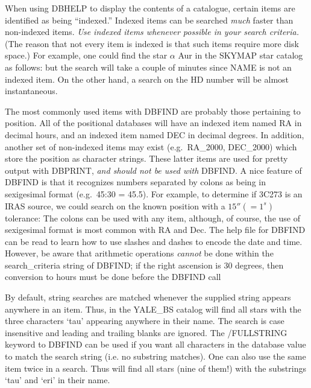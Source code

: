 When using DBHELP to display the contents of a catalogue, certain items are
identified as being ``indexed.''  Indexed items can be searched {\em much} 
faster than non-indexed items. 
{\em Use indexed items whenever possible in your search criteria.}   
(The reason that not every item is indexed is that such items require more disk
space.)
For example, one could find
the star $\alpha$ Aur in the SKYMAP star catalog as follows:
\exbegin
{}
\exend
but the search will take a couple of  minutes since NAME is not an indexed
item.  On the other hand, a search on the HD number will be almost
instantaneous.
\exbegin
{}
\exend 

The most commonly used items with DBFIND are probably those 
pertaining to position.
All of the positional databases will have an indexed item named RA in decimal
hours, and an indexed item named DEC in decimal degrees.  In addition, another
set of non-indexed items may exist (e.g.\ RA\_2000, DEC\_2000) which store
the position as character strings.  These latter items are used for pretty
output with DBPRINT, {\em and should not be used with} DBFIND.  A nice
feature of DBFIND is that it recognizes numbers separated by colons as being
in sexigesimal format (e.g.\  45:30 = 45.5).
For example, to determine if 3C273 is an IRAS source, we could search on the
known position with a $15'' (=1^s)$ tolerance:
\exbegin
{}
\exend
The colons can be used with any item, although, of course, the use of 
sexigesimal format is most common with RA and Dec.   The help file for
DBFIND can be read to learn how to use slashes and dashes to encode the
date and time.  However, be aware that arithmetic operations {\em cannot}
be done within the search\_criteria string of DBFIND; if the right ascension
is 30 degrees, then conversion to hours must be done before the DBFIND call
\exbegin
{}
\exend

By default, string searches are matched whenever the supplied string appears anywhere in
an item.   Thus, in the YALE\_BS catalog
will find all stars with the three characters `tau' appearing anywhere in
their name.    The search is case insensitive and leading and trailing blanks 
are ignored.   The /FULLSTRING keyword to DBFIND can be used if you want all
characters in the database value to match the search string (i.e. no substring
matches).  One can also use the same item twice in a search.   Thus
will find all stars (nine of them!) with the substrings `tau' and `eri' in
their name.

